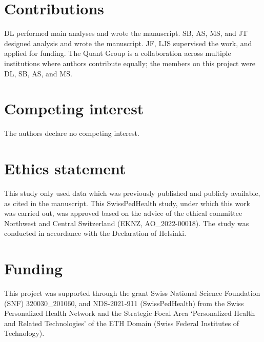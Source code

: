 \section*{Contributions}
\noindent 
DL performed main analyses and wrote the manuscript.
SB, AS, MS, and JT designed analysis and wrote the manuscript.
JF, LJS supervised the work, and applied for funding.
The Quant Group is a collaboration across multiple institutions where authors contribute equally; the members on this project were DL, SB, AS, and MS.

\section*{Competing interest}
\noindent
The authors declare no competing interest. 

\section*{Ethics statement}
\noindent
This study only used data which was previously published and publicly available, as cited in the manuscript.
This  SwissPedHealth study, under which this work was carried out, was approved based on the advice of the ethical committee Northwest and Central Switzerland (EKNZ, AO\_2022-00018). 
The study was conducted in accordance with the Declaration of Helsinki.

\section*{Funding}
\noindent This project was supported through the grant Swiss National Science Foundation (SNF) 320030\_201060, and NDS-2021-911 (SwissPedHealth) from the Swiss Personalized Health Network and the Strategic Focal Area `Personalized Health and Related Technologies' of the ETH Domain (Swiss Federal Institutes of Technology).




\clearpage
\beginsupplement
